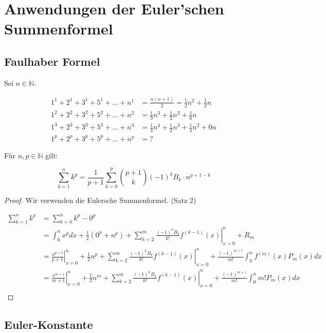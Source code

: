 \documentclass[12pt]{article}
\begin{document}
\section{Anwendungen der Euler'schen Summenformel}
\subsection{Faulhaber Formel}

Sei \(n \in \mathbb{N}\).

\begin{align*}
1^1+2^1+3^1+5^1+...+n^1 &= \frac{n(n+1)}{2}=\frac{1}{2}n^2+\frac{1}{2}n \\
1^2+2^2+3^2+5^2+...+n^2 &= \frac{1}{3}n^3 + \frac{1}{2}n^2+\frac{1}{6}n \\
1^3+2^3+3^3+5^3+...+n^3 &= \frac{1}{4}n^4 + \frac{1}{2}n^3 + \frac{1}{4}n^2+0n \\
1^p+2^p+3^p+5^p+...+n^p &= ?
\end{align*}

\begin{theorem}
Für \(n, p \in \mathbb{N}\) gilt:

\[\sum_{k=1}^n k^p = \frac{1}{p+1} \sum_{k=0}^p {p+1 \choose k} (-1)^k B_k \cdot n^{p+1-k}\]
\end{theorem}
\begin{proof}
Wir verwenden die Eulersche  Summenformel. (Satz 2)

\begin{align*}
\sum_{k=1}^n k^p &= \sum_{k=0}^n k^p - 0^p \\
&= \int_0^n x^p dx + \frac{1}{2}(0^p+n^p) + \sum_{k=2}^m \left. \frac{(-1)^k B_k}{k!} f^{(k-1)}(x) \right|_{x=0}^n + R_m \\
&= \left. \frac{x^{p+1}}{p+1} \right|_{x=0}^n + \frac{1}{2}n^p + \sum_{k=2}^m \left. \frac{(-1)^k B_k}{k!} f^{(k-1)}(x) \right|_{x=0}^n + \frac{(-1)^{m+1}}{m!} \int_0^n f^{(m)}(x) P_m(x) dx \\
&= \left. \frac{x^{m+1}}{m+1} \right|_{x=0}^n + \frac{1}{2}n^m + \sum_{k=2}^m \left. \frac{(-1)^k B_k}{k!} f^{(k-1)}(x) \right|_{x=0}^n + \frac{(-1)^{m+1}}{m!} \int_0^n m! P_m(x) dx \\
\end{align*}
\end{proof}

\subsection{Euler-Konstante}
\end{document}
